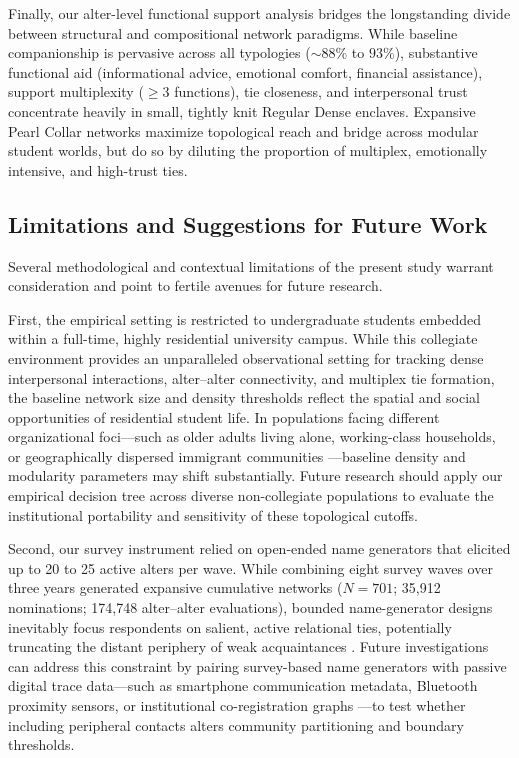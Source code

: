 \documentclass[12pt]{article}
\begin{document}
Finally, our alter-level functional support analysis bridges the longstanding divide between structural and compositional network paradigms. While baseline companionship is pervasive across all typologies ($\sim 88\%$ to $93\%$), substantive functional aid (informational advice, emotional comfort, financial assistance), support multiplexity ($\ge 3$ functions), tie closeness, and interpersonal trust concentrate heavily in small, tightly knit Regular Dense enclaves. Expansive Pearl Collar networks maximize topological reach and bridge across modular student worlds, but do so by diluting the proportion of multiplex, emotionally intensive, and high-trust ties.

\subsection{Limitations and Suggestions for Future Work}

Several methodological and contextual limitations of the present study warrant consideration and point to fertile avenues for future research.

First, the empirical setting is restricted to undergraduate students embedded within a full-time, highly residential university campus. While this collegiate environment provides an unparalleled observational setting for tracking dense interpersonal interactions, alter--alter connectivity, and multiplex tie formation, the baseline network size and density thresholds reflect the spatial and social opportunities of residential student life. In populations facing different organizational foci---such as older adults living alone, working-class households, or geographically dispersed immigrant communities \citep{pelle2021clustering, vacca2020structure}---baseline density and modularity parameters may shift substantially. Future research should apply our empirical decision tree across diverse non-collegiate populations to evaluate the institutional portability and sensitivity of these topological cutoffs.

Second, our survey instrument relied on open-ended name generators that elicited up to 20 to 25 active alters per wave. While combining eight survey waves over three years generated expansive cumulative networks ($N = 701$; 35,912 nominations; 174,748 alter--alter evaluations), bounded name-generator designs inevitably focus respondents on salient, active relational ties, potentially truncating the distant periphery of weak acquaintances \citep{granovetter1973strength}. Future investigations can address this constraint by pairing survey-based name generators with passive digital trace data---such as smartphone communication metadata, Bluetooth proximity sensors, or institutional co-registration graphs \citep{liu2018network}---to test whether including peripheral contacts alters community partitioning and boundary thresholds.
\end{document}
